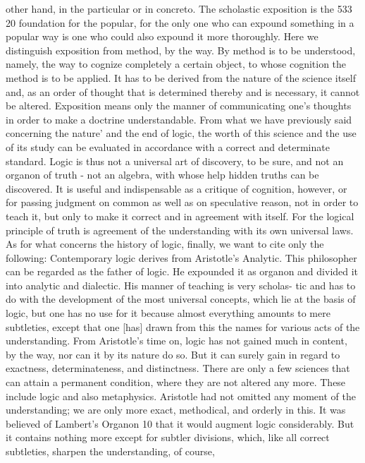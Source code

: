 other hand, in the particular or in concreto. The scholastic exposition is the
533
20
foundation for the popular, for the only one who can expound something
in a popular way is one who could also expound it more thoroughly.
Here we distinguish exposition from method, by the way. By method is to
be understood, namely, the way to cognize completely a certain object, to
whose cognition the method is to be applied. It has to be derived from the
nature of the science itself and, as an order of thought that is determined
thereby and is necessary, it cannot be altered. Exposition means only the
manner of communicating one's thoughts in order to make a doctrine
understandable.
From what we have previously said concerning the nature' and the end of
logic, the worth of this science and the use of its study can be evaluated in
accordance with a correct and determinate standard.
Logic is thus not a universal art of discovery, to be sure, and not an
organon of truth - not an algebra, with whose help hidden truths can be
discovered.
It is useful and indispensable as a critique of cognition, however, or for
passing judgment on common as well as on speculative reason, not in
order to teach it, but only to make it correct and in agreement with itself.
For the logical principle of truth is agreement of the understanding with
its own universal laws.
As for what concerns the history of logic, finally, we want to cite only the
following:
Contemporary logic derives from Aristotle's Analytic. This philosopher
can be regarded as the father of logic. He expounded it as organon and
divided it into analytic and dialectic. His manner of teaching is very scholas-
tic and has to do with the development of the most universal concepts,
which lie at the basis of logic, but one has no use for it because almost
everything amounts to mere subtleties, except that one [has] drawn from
this the names for various acts of the understanding.
From Aristotle's time on, logic has not gained much in content, by the
way, nor can it by its nature do so. But it can surely gain in regard to
exactness, determinateness, and distinctness. There are only a few sciences
that can attain a permanent condition, where they are not altered any
more. These include logic and also metaphysics. Aristotle had not omitted
any moment of the understanding; we are only more exact, methodical,
and orderly in this.
It was believed of Lambert's Organon 10 that it would augment logic
considerably. But it contains nothing more except for subtler divisions,
which, like all correct subtleties, sharpen the understanding, of course,
